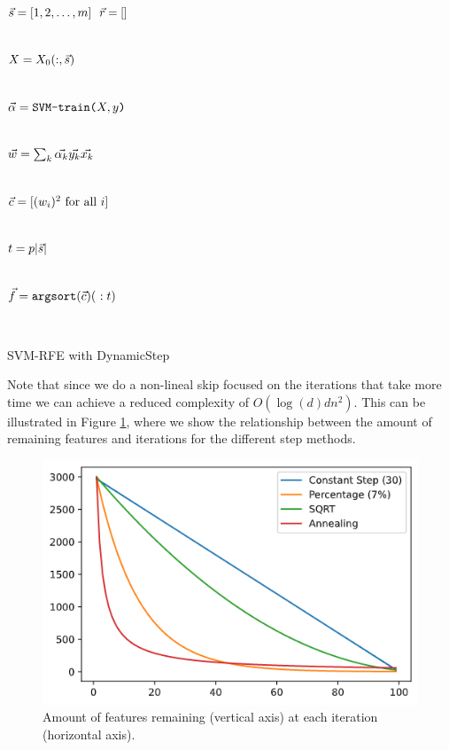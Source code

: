 \begin{algorithm}[h]
    \DontPrintSemicolon
      $\vec{s} = [1,2, \dotsc, m]$ 
      $\vec{r} = []$  
        {
            \\
            $X=X_0(:,\vec{s})$\VS

            \\
            $\vec{\alpha} = \texttt{SVM-train(} X, y \texttt{)}$\VS

            \\
            $\vec{w} = \sum_k{\vec{\alpha_k} \vec{y_k} \vec{x_k}}$\VS

            \\
            $\vec{c} = [(w_i)^2 \text{ for all $i$}]$\VS

            \\
            $t = p|\vec{s}|$\VS

            \\
            $\vt{f} = \texttt{argsort}(\vt{c})(\ :t)$\VS

            \\
        }
    \caption{SVM-RFE with DynamicStep}
\end{algorithm}
\VS
Note that since we do a non-lineal skip focused on the iterations that take more time we can achieve a reduced complexity of $O(\log(d)dn^2)$. This can be illustrated in Figure \ref{fig:ch5.dstep.comparetime}, where we show the relationship between the amount of remaining features and iterations for the different step methods. 

\begin{figure}[h]
    \centering
    \includegraphics[width=0.4\linewidth]{img/ch5/comparetimes.png}
    \caption{Amount of features remaining (vertical axis) at each iteration (horizontal axis).}
    \label{fig:ch5.dstep.comparetime}
\end{figure}

